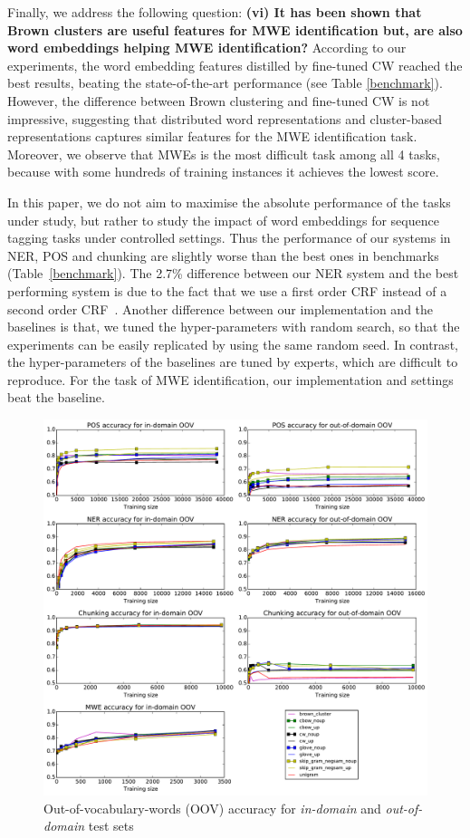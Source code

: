 Finally, we address the following question: \textbf{(vi) It has been shown that Brown clusters are useful features for MWE identification but, are also word embeddings helping MWE identification?} 
According to our experiments, the word embedding features distilled by fine-tuned CW reached the best results, beating the state-of-the-art performance (see Table \ref{benchmark}).
However, the difference between Brown clustering and fine-tuned CW is not impressive, suggesting that distributed word representations and cluster-based representations captures similar features for the MWE identification task. Moreover, we observe that MWEs is the most difficult task among all 4 tasks, because with some hundreds of training instances it achieves the lowest score.


In this paper, we do not aim to maximise the absolute performance of the tasks under 
study, but rather to study the impact of word embeddings for sequence tagging tasks under controlled settings. Thus the performance of our systems in NER, POS and chunking are slightly worse than the best ones in benchmarks (Table~\ref{benchmark}). The 2.7\% difference between our NER system and the best performing system is due to the fact that we use a first order CRF instead of a second order CRF~\cite{Ando:2005}. Another difference between our implementation and the baselines is that, we tuned the hyper-parameters with random search, so that the experiments can be easily replicated by using the same random seed. In contrast, the hyper-parameters of the baselines are tuned by experts, which are difficult to reproduce. For the task of MWE identification, our implementation and settings beat the baseline.



\begin{figure}
\centering
\caption{Out-of-vocabulary-words (OOV) accuracy for \textit{in-domain} and \textit{out-of-domain} test sets}
\label{OOV} 
    	\includegraphics[scale=0.5]{plots/OOV-plots}
\end{figure}







